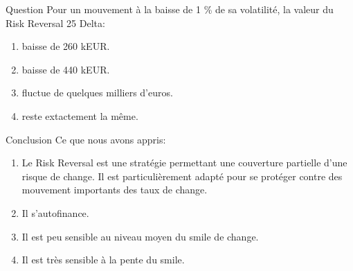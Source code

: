 \documentclass{beamer}
\begin{document}
\begin{frame}{Question}
Pour un mouvement à la baisse de 1 \% de sa volatilité, la valeur du Risk Reversal 25 Delta:\\
\begin{enumerate}
\item baisse de 260 kEUR.
\item baisse de 440 kEUR.
\item fluctue de quelques milliers d'euros.
\item reste extactement la même.
\end{enumerate}
\end{frame}

\begin{frame}{Conclusion}
Ce que nous avons appris:
\begin{enumerate}
\item<2-> Le Risk Reversal est une stratégie permettant une couverture partielle d'une risque de change. Il est particulièrement adapté pour se protéger contre des mouvement importants des taux de change.
\item<3-> Il s'autofinance.
\item<4-> Il est peu sensible au niveau moyen du smile de change.
\item<5-> Il est très sensible à la pente du smile. 
\end{enumerate}
\end{frame}
\end{document}
